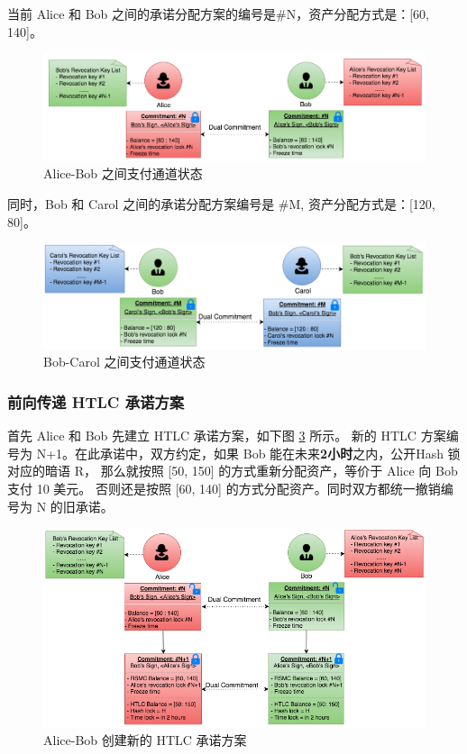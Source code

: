 \begin{appendices}
当前 Alice 和 Bob 之间的承诺分配方案的编号是\#N，资产分配方式是：[60, 140]。

\begin{figure}[h!]
    \centering
    \includegraphics[width=12cm, keepaspectratio]{../images/alice_bob_1.png}
    \caption{Alice-Bob 之间支付通道状态}
    \label{fig:A_alice_bob_1}
\end{figure}

同时，Bob 和 Carol 之间的承诺分配方案编号是 \#M, 资产分配方式是：[120, 80]。

\begin{figure}[h!]
    \centering
    \includegraphics[width=12cm, keepaspectratio]{../images/bob_carol_1.png}
    \caption{Bob-Carol 之间支付通道状态}
    \label{fig:A_bob_carol_1}
\end{figure}

\subsubsection{前向传递 HTLC 承诺方案}
首先 Alice 和 Bob 先建立 HTLC 承诺方案，如下图 \ref{fig:A_alice_bob_2} 所示。
新的 HTLC 方案编号为 N+1。在此承诺中，双方约定，如果 Bob 能在未来\textbf{2小时}之内，公开Hash 锁对应的暗语 R，
那么就按照 [50, 150] 的方式重新分配资产，等价于 Alice 向 Bob 支付 10 美元。
否则还是按照 [60, 140] 的方式分配资产。同时双方都统一撤销编号为 N 的旧承诺。

\begin{figure}[h!]
    \centering
    \includegraphics[width=12cm, keepaspectratio]{../images/alice_bob_2.png}
    \caption{Alice-Bob 创建新的 HTLC 承诺方案}
    \label{fig:A_alice_bob_2}
\end{figure}


\end{appendices}
